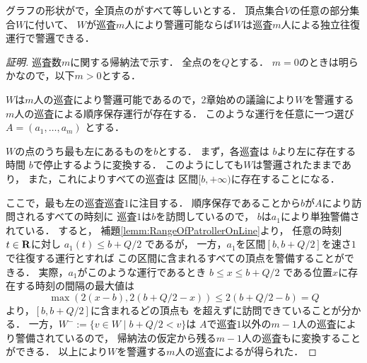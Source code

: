 \begin{lemm}
 \label{lemm:LineEqualTimelimitIndependentInterval}
  グラフの形状が{\graphLine}で，全頂点の{\idletime}がすべて等しいとする．
  頂点集合$V$の任意の部分集合$W$に付いて、
  $W$が巡査$m$人により警邏可能ならば$W$は巡査$m$人による独立往復運行で警邏できる．
\end{lemm}
\begin{proof}[証明]
  \newcommand{\leftmostpoint}{b}  %
  \newcommand{\newpatroller}{l}
  \newcommand{\leftmostpatroller}{巡査1}
  \newcommand{\leftmostpatOpr}{a_1}

  巡査数$m$に関する帰納法で示す．
  全点の{\idletime}を$Q$とする．
  $m = 0$のときは明らかなので，以下$m > 0$とする．

  $W$は$m$人の巡査により警邏可能であるので，2章始めの議論により$W$を警邏する$m$人の巡査による順序保存運行が存在する．
  このような運行を任意に一つ選び
  $A = (a _1, \ldots, a _m)$
  とする．

  $W$の点のうち最も左にあるものを$\leftmostpoint$とする．
  まず，各巡査は
  $\leftmostpoint$より左に存在する時間
  $\leftmostpoint$で停止するように変換する．
  このようにしても$W$は警邏されたままであり，
  また，これによりすべての巡査は
  区間$[\leftmostpoint, +\infty)$に存在することになる．

  ここで，最も左の巡査$\leftmostpatroller$に注目する．
  順序保存であることから$\leftmostpoint$が$A$により訪問されるすべての時刻に
  $\leftmostpatroller$は$\leftmostpoint$を訪問しているので，
  $\leftmostpoint$は$\leftmostpatOpr$により単独警備されている．
  すると，
  補題\ref{lemm:RangeOfPatrollerOnLine}より，
  任意の時刻$t \in \mathbf R$に対し
  $\leftmostpatOpr(t) \leq \leftmostpoint + Q/2$
  であるが，
  一方，$\leftmostpatOpr$を区間$[b, b + Q/2]$を速さ$1$で往復する運行とすれば
  この区間に含まれるすべての頂点を警備することができる．
  実際，$\leftmostpatOpr$がこのような運行であるとき
  $\leftmostpoint \leq x \leq \leftmostpoint + Q/2$
  である位置$x$に存在する時刻の間隔の最大値は
  \[
    \max( 2(x - \leftmostpoint), 2(\leftmostpoint + Q/2 - x) )
    \leq 2(\leftmostpoint + Q/2 - \leftmostpoint) = Q
  \]
  より，$[\leftmostpoint, \leftmostpoint + Q/2]$に含まれるどの頂点も
  {\idletime}を超えずに訪問できていることが分かる．
  一方，$W^- := \{ v \in W \mid \leftmostpoint + Q/2 < v \}$は
  $A$で$\leftmostpatroller$以外の$m - 1$人の巡査により警備されているので，
  帰納法の仮定から残る$m - 1$人の巡査も{\indSectOperation}に変換することができる．
  以上により$W$を警邏する$m$人の巡査による{\indSectOperation}が得られた．
\end{proof}


